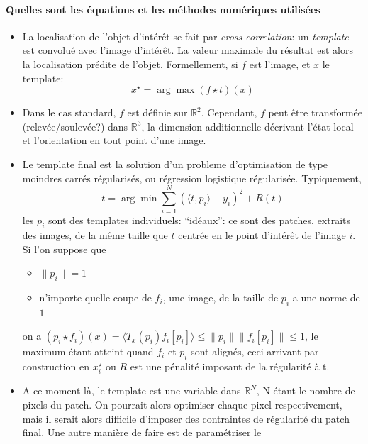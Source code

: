 \documentclass{article}
\begin{document}
\paragraph{Quelles sont les équations et les méthodes numériques utilisées} 
\begin{itemize}
    \item La localisation de l'objet d'intérêt se fait par \emph{cross-correlation}: un
        \emph{template} est convolué avec l'image d'intérêt. La valeur maximale du
        résultat est alors la localisation prédite de l'objet. Formellement, si $ f $
        est l'image, et $ x $
    le template:
    \[
        {x}^{\star} = \arg \max_{  } \left ( f \star t \right )(x)
    \] 
    \item Dans le cas standard, $ f $ est définie sur $ \mathbb{R}^2 $. Cependant, $ f $
        peut être transformée (relevée/soulevée?) dans $ \mathbb{R}^3 $, la dimension
        additionnelle décrivant l'état local et l'orientation en tout point d'une image.
    \item Le template final est la solution d'un probleme d'optimisation de type
        moindres carrés régularisés, ou régression logistique régularisée.
        Typiquement,
        \[
        t = \arg \min_{  } \sum\limits_{ i=1 }^{ N } \left ( \langle t, p_i \rangle
        - y_i \right )^2 + R(t) 
        \] 
        les $ p_i $ sont des templates individuels: ``idéaux'': ce sont des patches,
        extraits des images, de la même taille que $ t $ centrée en le point d'intérêt
        de l'image $ i $. Si l'on suppose que 
        \begin{itemize}
            \item $ \|p_i\| = 1 $
            \item n'importe quelle coupe de $ f_i $, une image, de la taille de $ p_i $ a une norme
                de $ 1 $
        \end{itemize}
        on a $ (p_i \star f_i)(x) = \mathcal  \langle T_x(p_i) f_i[p_i] \rangle  \leq
        \|p_i\| \|f_i[p_i]\| \leq  1$, le maximum étant atteint quand $ f_i $ et $ p_i $ 
        sont alignés, ceci arrivant par construction en $ {x}^{\star}_i $
        ou $ R $ est une pénalité imposant de la régularité à t.
    \item A ce moment là, le template est une variable dans $ \mathbb{R}^N$, N étant le
        nombre de pixels du patch. On pourrait alors optimiser chaque pixel
        respectivement, mais il serait alors difficile d'imposer des contraintes de
        régularité du patch final. Une autre manière de faire est de paramétriser le

\end{itemize}
\end{document}
